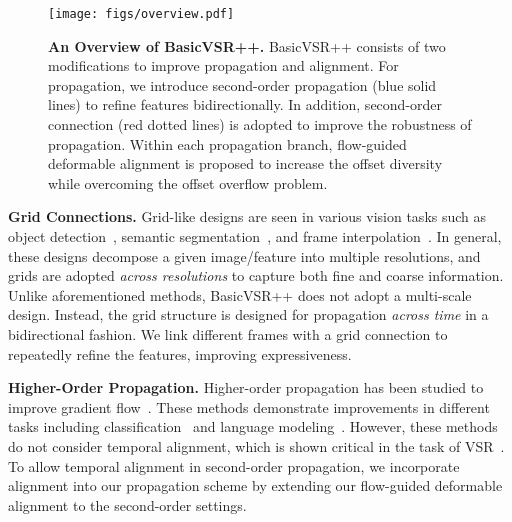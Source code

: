 \documentclass[10pt,twocolumn,letterpaper]{article}
\begin{document}
\begin{figure*}[!t]
    \begin{center}
        \texttt{[image: figs/overview.pdf]}\vspace{-0.2cm}
        \caption{\textbf{An Overview of BasicVSR++.} BasicVSR++ consists of two modifications to improve propagation and alignment. For propagation, we introduce second-order propagation (blue solid lines) to refine features bidirectionally. In addition, second-order connection (red dotted lines) is adopted to improve the robustness of propagation. Within each propagation branch, flow-guided deformable alignment is proposed to increase the offset diversity while overcoming the offset overflow problem.}
        \label{fig:overview}
    \end{center}
    \vspace{-0.5cm}
\end{figure*}

\noindent\textbf{Grid Connections.}
Grid-like designs are seen in various vision tasks such as object detection~\cite{chen2018optimizing,sun2019high,wang2020deep}, semantic segmentation~\cite{fourure2017residual,sun2019high,wang2020deep,zhuang2019shelf}, and frame interpolation~\cite{niklaus2020softmax}. In general, these designs decompose a given image/feature into multiple resolutions, and grids are adopted \textit{across resolutions} to capture both fine and coarse information.
Unlike aforementioned methods, BasicVSR++ does not adopt a multi-scale design. Instead, the grid structure is designed for propagation \textit{across time} in a bidirectional fashion. We link different frames with a grid connection to repeatedly refine the features, improving expressiveness.

\noindent\textbf{Higher-Order Propagation.}
Higher-order propagation has been studied to improve gradient flow~\cite{ke2018sparse,lin1996learning,soltani2016higher}. These methods demonstrate improvements in different tasks including classification~\cite{ke2018sparse} and language modeling~\cite{soltani2016higher}. However, these methods do not consider temporal alignment, which is shown critical in the task of VSR~\cite{chan2021basicvsr}. To allow temporal alignment in second-order propagation, we incorporate alignment into our propagation scheme by extending our flow-guided deformable alignment to the second-order settings.
\end{document}
